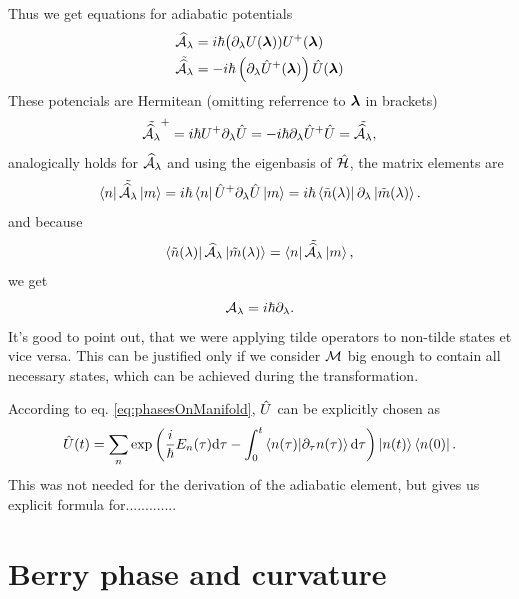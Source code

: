 Thus we get equations for adiabatic potentials
\begin{align}
    \AA_\lambda&=i\hbar \big(\partial_\lambda U(\llambda))U^+(\llambda)
    \label{eq:adiabaticPotential}\\
    \tilde{\AA_\lambda} &= -i\hbar\left(\partial_\lambda \U^+(\llambda)\right)\U(\llambda)
    \label{eq:adiabaticPotentialTilde}
\end{align}
These potencials are Hermitean (omitting referrence to $\llambda$ in brackets)
\begin{equation}
     \tilde{\AA_\lambda}^+=i\hbar U^+\partial_\lambda\U=-i\hbar\partial_\lambda\U^+\U = \tilde{\AA_\lambda} ,
\end{equation}
analogically holds for $\AA_\lambda$ and using the eigenbasis of $\HH$, the matrix elements are
\begin{equation}
    \bra{n}\tilde{\AA_\lambda}\ket{m}=i\hbar\bra{n}\U^+\partial_\lambda\U\ket{m} = i\hbar\bra{\tilde n(\lambda)}\partial_\lambda\ket{\tilde m(\lambda)}.
\end{equation}
and because
\begin{equation}
    \bra{\tilde n(\lambda)}\AA_\lambda\ket{\tilde m(\lambda)}= \bra{n}\tilde{\AA_\lambda}\ket{m},
\end{equation}
we get
\begin{equation}
    \A_\lambda = i\hbar\partial_\lambda.
    \label{eq:adiabaticPotentialDefinition}
\end{equation}
It's good to point out, that we were applying tilde operators to non-tilde states et vice versa. This can be justified only if we consider $\M$ big enough to contain all necessary states, which can be achieved during the transformation.


According to eq. \ref{eq:phasesOnManifold}, $\U$ can be explicitly chosen as
\begin{equation}
    \U(t)=\sum_n \exp\left(\frac{i}{\hbar}E_n(\tau)\d \tau - \int_0^t \braket{n(\tau)|\partial_\tau n(\tau)}\d\tau\right)\ket{n(t)}\bra{n(0)}.
\end{equation}
This was not needed for the derivation of the adiabatic element, but gives us explicit formula for.............


\section{Berry phase and curvature}

